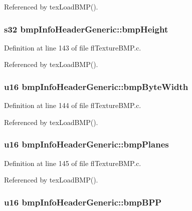 Referenced by tex\-Load\-BMP().
\subsubsection{\setlength{\rightskip}{0pt plus 5cm}s32 {\bf bmp\-Info\-Header\-Generic::bmp\-Height}}\label{structbmpInfoHeaderGeneric_8a22f42046a61390650cdf6cc91400a3}




Definition at line 143 of file fl\-Texture\-BMP.c.

Referenced by tex\-Load\-BMP().
\subsubsection{\setlength{\rightskip}{0pt plus 5cm}u16 {\bf bmp\-Info\-Header\-Generic::bmp\-Byte\-Width}}\label{structbmpInfoHeaderGeneric_900cc5e1e7da1a067eec4ad727685013}




Definition at line 144 of file fl\-Texture\-BMP.c.

Referenced by tex\-Load\-BMP().
\subsubsection{\setlength{\rightskip}{0pt plus 5cm}u16 {\bf bmp\-Info\-Header\-Generic::bmp\-Planes}}\label{structbmpInfoHeaderGeneric_f4617378cf5b46b6b6c80f89dae343a7}




Definition at line 145 of file fl\-Texture\-BMP.c.

Referenced by tex\-Load\-BMP().
\subsubsection{\setlength{\rightskip}{0pt plus 5cm}u16 {\bf bmp\-Info\-Header\-Generic::bmp\-BPP}}\label{structbmpInfoHeaderGeneric_b84bf537bc27f27d34bd5e377baa12ca}




